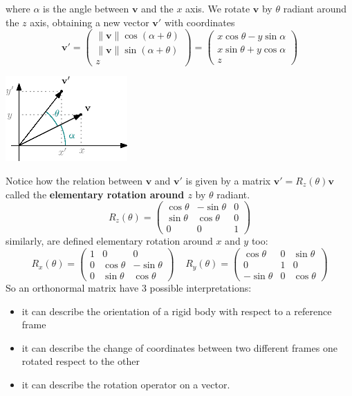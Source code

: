 \documentclass[10pt, letterpaper]{report}
\begin{document}
where $\alpha$ is the angle between $\mathbf v$ and the $x$ axis. We rotate $\mathbf v$ by $\theta$ radiant around the $z$ axis, obtaining a new vector $\mathbf v'$ with coordinates$$
\mathbf v'=\begin{pmatrix}
    \|\mathbf v\|\cos(\alpha+\theta)\\ 
    \|\mathbf v\|\sin(\alpha+\theta)\\z
\end{pmatrix}=\begin{pmatrix}
    x\cos\theta-y\sin\alpha\\ 
    x\sin\theta+y\cos\alpha\\z
\end{pmatrix}
$$\begin{center}
    \includegraphics[width=0.35\textwidth ]{images/rotation_around_z.eps}
\end{center}
Notice how the relation between $\mathbf v$ and $\mathbf v'$ is given by a matrix $ \mathbf v'=R_z(\theta)\mathbf v$ called the \textbf{elementary rotation around $z$} by $\theta$ radiant.\begin{equation}
    R_z(\theta) =\begin{pmatrix}
        \cos\theta & -\sin\theta&0\\
        \sin\theta&\cos\theta&0\\
        0&0&1
    \end{pmatrix} 
\end{equation}
similarly, are defined elementary rotation around $x$ and $y$ too:\begin{equation}
     R_x(\theta) =\begin{pmatrix}
        1&0&0\\
        0&\cos\theta & -\sin\theta\\
        0&\sin\theta&\cos\theta
    \end{pmatrix}  \ \ \ \ \  
    R_y(\theta) =\begin{pmatrix}
        \cos\theta&0&\sin\theta\\ 0&1&0\\ -\sin\theta&0&\cos\theta
    \end{pmatrix} 
\end{equation}
So an orthonormal matrix have 3 possible interpretations:\begin{itemize}
    \item it can describe the orientation of a rigid body with respect to a reference frame
    \item it can describe the change of coordinates between two different frames one rotated respect to the other
    \item it can describe the rotation operator on a vector.
\end{itemize}
\end{document}
